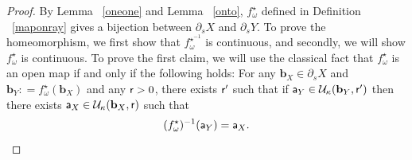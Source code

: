 \documentclass[12 pt]{amsart}
\newcommand{\calN}{\mathcal{N}}
\newcommand{\calU}{\mathcal{U}}
\newcommand{\calV}{\mathcal{V}}
\newcommand{\bfa}{\textbf{a}}
\newcommand{\bfb}{\textbf{b}}
\theoremstyle{definition}
\theoremstyle{remark}
\newcommand{\sQ}{{\sf Q}}
\newcommand{\sR}{{\sf R}}
\renewcommand{\bfa}{{\sf a}}
\newcommand{\mm}{{\sf m}}
\newcommand{\nn}{{\sf n}}
\newcommand{\qq}{{\sf q}}
\newcommand{\rr}{{\sf r}}
\newcommand{\ps}{{\partial_s}}
\begin{document}
\begin{proof}

By Lemma ~\ref{oneone} and Lemma ~\ref{onto}, $f_\omega^\star$ defined in Definition ~\ref{maponray} gives a bijection between $\partial_sX$ 
and $\partial_s Y$. To prove the homeomorphism, we first show that $f_\omega^{\star^{-1}}$ is continuous, and secondly, we will show $f_\omega^\star$ is continuous. 
\newline To prove the first claim, we will use the classical fact that  $f_\omega^{\star}$ is an open map
if and only if the following holds:
For any $\bfb_X \in \ps X$ and $\bfb_Y : =f_\omega^\star(\bfb_X)$ and any $ \rr> 0$, there exists $\rr'$  such that if $\bfa_Y\in \calU_\kappa (\bfb_Y,\rr')$ then there exists $\bfa_X \in \calU_\kappa (\bfb_X,\rr)$ such that \[ (f_\omega^\star)^{-1}(\bfa_Y)=\bfa_X.\]



\end{proof}
\end{document}
